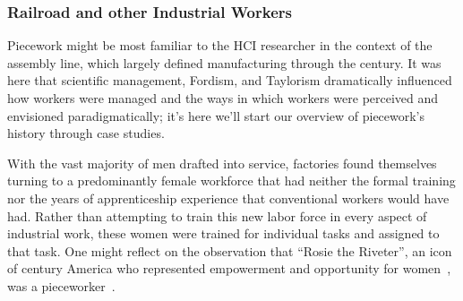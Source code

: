 \documentclass[trackingWork]{subfiles}
\begin{document}





\onlyinsubfile{\clearpage}
\subsubsection{Railroad and other Industrial Workers}
{Piecework might be most familiar to the HCI researcher in the context of the assembly line, which largely defined manufacturing through the  century.}
It was here that
scientific management, Fordism, and Taylorism
dramatically influenced how workers were managed and
the ways in which workers were perceived and envisioned paradigmatically;
it's here we'll start our overview of piecework's history through case studies.



With the vast majority of men drafted into service,
factories found themselves turning to
a predominantly female workforce that had neither
the formal training nor
the years of apprenticeship experience
that conventional workers would have had.
Rather than attempting to train this new labor force in every aspect of industrial work,
these women were trained for individual tasks
and assigned to that task. %
One might reflect on the observation that ``Rosie the Riveter'',
an icon of  century America who
represented empowerment and opportunity for women~\cite{honey1985creating},
was a pieceworker~\cite{davies2014origins}.
\end{document}
